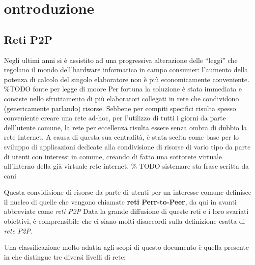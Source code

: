 \chapter{ontroduzione}\label{ontroduzione}

\section{Reti P2P}\label{reti-p2p}

Negli ultimi anni si è assistito ad una progressiva alterazione delle
``leggi'' che regolano il mondo dell'hardware informatico in campo
consumer: l'aumento della potenza di calcolo del singolo elaboratore non
è più economicamente conveniente. \%TODO fonte per legge di moore Per
fortuna la soluzione è stata immediata e consiste nello sfruttamento di
più elaboratori collegati in rete che condividono (genericamente
parlando) risorse. Sebbene per compiti specifici risulta spesso
conveniente creare una rete ad-hoc, per l'utilizzo di tutti i giorni da
parte dell'utente comune, la rete per eccellenza risulta essere senza
ombra di dubbio la rete Internet. A causa di questa sua centralità, è
stata scelta come base per lo sviluppo di applicazioni dedicate alla
condivisione di risorse di vario tipo da parte di utenti con interessi
in comune, creando di fatto una sottorete virtuale all'interno della già
virtuale rete internet. \% TODO sistemare sta frase scritta da cani

Questa convidisione di risorse da parte di utenti per un interesse
comune definisce il nucleo di quelle che vengono chiamate \textbf{reti
Perr-to-Peer}, da qui in avanti abbreviate come \emph{reti P2P} Data la
grande diffusione di queste reti e i loro svariati obiettivi, è
comprensibile che ci siano molti disaccordi sulla definizione esatta di
\emph{rete P2P}.

Una classificazione molto adatta agli scopi di questo documento è quella
presente in \cite{kurose-ross} che distingue tre diversi livelli di
rete:

